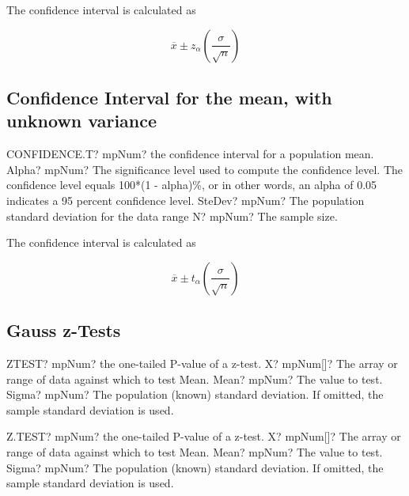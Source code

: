 The confidence interval is calculated as

\begin{equation}
	\overline{x} \pm z_{\alpha} \left(\frac{\sigma}{\sqrt{n}} \right)
\end{equation}



\subsection{Confidence Interval for the mean, with unknown variance}

\begin{mpFunctionsExtract}
	\mpWorksheetFunctionThreeNotImplemented
	{CONFIDENCE.T? mpNum? the confidence interval for a population mean.}
	{Alpha? mpNum? The significance level used to compute the confidence level. The confidence level equals 100*(1 - alpha)\%, or in other words, an alpha of 0.05 indicates a 95 percent confidence level.
	}
	{SteDev? mpNum? The population standard deviation for the data range}
	{N? mpNum? The sample size.}
\end{mpFunctionsExtract}

The confidence interval is calculated as

\begin{equation}
	\overline{x} \pm t_{\alpha} \left(\frac{\sigma}{\sqrt{n}} \right)
\end{equation}



\subsection{Gauss z-Tests}

\begin{mpFunctionsExtract}
	\mpWorksheetFunctionThreeNotImplemented
	{ZTEST? mpNum? the one-tailed P-value of a z-test.}
	{X? mpNum[]? The array or range of data against which to test Mean.}
	{Mean? mpNum? The value to test.}
	{Sigma? mpNum? The population (known) standard deviation. If omitted, the sample standard deviation is used.}
\end{mpFunctionsExtract}


\vspace{0.6cm}
\begin{mpFunctionsExtract}
	\mpWorksheetFunctionThreeNotImplemented
	{Z.TEST? mpNum? the one-tailed P-value of a z-test.}
	{X? mpNum[]? The array or range of data against which to test Mean.}
	{Mean? mpNum? The value to test.}
	{Sigma? mpNum? The population (known) standard deviation. If omitted, the sample standard deviation is used.}
\end{mpFunctionsExtract}


